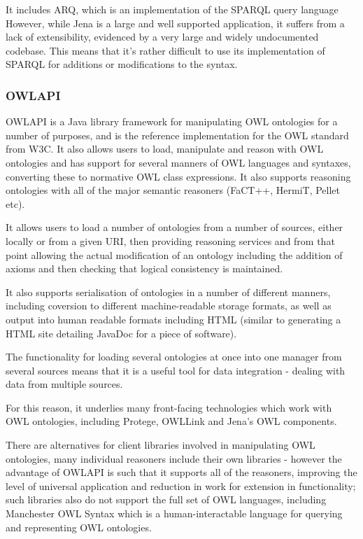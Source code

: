 \documentclass{article}
\begin{document}
It includes ARQ, which is an implementation of the SPARQL query language
However, while Jena is a large and well supported application, it suffers 
from a lack of extensibility, evidenced by a very large and widely undocumented 
codebase. This means that it's rather difficult to use its implementation of
SPARQL for additions or modifications to the syntax.

\subsubsection{OWLAPI}

OWLAPI is a Java library framework for manipulating OWL ontologies for a number of
purposes, and is the reference implementation for the OWL standard from W3C. 
It also allows users to load, manipulate and reason with OWL ontologies and has 
support for several manners of OWL languages and syntaxes, converting these to 
normative OWL class expressions. It also supports reasoning ontologies with all
of the major semantic reasoners (FaCT++, HermiT, Pellet etc).

It allows users to load a number of ontologies from a number of sources, either
locally or from a given URI, then providing reasoning services and from that
point allowing the actual modification of an ontology including the addition of
axioms and then checking that logical consistency is maintained.

It also supports serialisation of ontologies in a number of different manners,
including coversion to different machine-readable storage formats, as well as
output into human readable formats including HTML (similar to generating a HTML
site detailing JavaDoc for a piece of software).

The functionality for loading several ontologies at once into one manager from
several sources means that it is a useful tool for data integration - dealing
with data from multiple sources.

For this reason, it underlies many front-facing technologies which work with OWL
ontologies, including Protege, OWLLink and Jena's OWL components.

There are alternatives for client libraries involved in manipulating OWL
ontologies, many individual reasoners include their own libraries - however the
advantage of OWLAPI is such that it supports all of the reasoners, improving
the level of universal application and reduction in work for extension in
functionality; such libraries also do not support the full set of OWL languages,
including Manchester OWL Syntax which is a human-interactable language for
querying and representing OWL ontologies.
\end{document}
